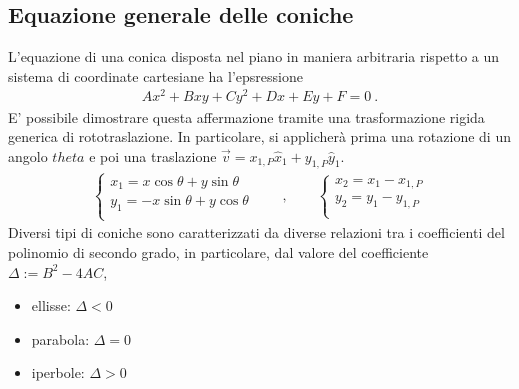 \documentclass[letterpaper,10pt,english]{jupyterBook}
\begin{document}
\subsection{Equazione generale delle coniche}
\label{\detokenize{ch/analytic_geometry/analytic_geometry_2d/conics-general:equazione-generale-delle-coniche}}\label{\detokenize{ch/analytic_geometry/analytic_geometry_2d/conics-general:geometry-analytic-2d-conics-general}}\label{\detokenize{ch/analytic_geometry/analytic_geometry_2d/conics-general::doc}}
\sphinxAtStartPar
L’equazione di una conica disposta nel piano in maniera arbitraria rispetto a un sistema di coordinate cartesiane ha l’epsressione
\begin{equation*}
\begin{split}A x^2 + B x y + C y^2 + D x + E y + F = 0 \ .\end{split}
\end{equation*}
\sphinxAtStartPar
E’ possibile dimostrare questa affermazione tramite una trasformazione rigida generica di roto\sphinxhyphen{}traslazione. In particolare, si applicherà prima una rotazione di un angolo \(theta\) e poi una traslazione \(\vec{v} = x_{1,P} \hat{x}_1 + y_{1,P} \hat{y}_1\).
\begin{equation*}
\begin{split}
\begin{cases}
x_1 =   x \cos \theta + y \sin \theta \\
y_1 = - x \sin \theta + y \cos \theta \\
\end{cases}
\qquad , \qquad
\begin{cases}
x_2 = x_1 - x_{1,P}  \\
y_2 = y_1 - y_{1,P}  \\
\end{cases}
\end{split}
\end{equation*}
\sphinxAtStartPar
Diversi tipi di coniche sono caratterizzati da diverse relazioni tra i coefficienti del polinomio di secondo grado, in particolare, dal valore del coefficiente \(\Delta := B^2 - 4 A C\),
\begin{itemize}
\item {} 
\sphinxAtStartPar
ellisse:  \(\Delta < 0\)

\item {} 
\sphinxAtStartPar
parabola: \(\Delta = 0\)

\item {} 
\sphinxAtStartPar
iperbole: \(\Delta > 0\)

\end{itemize}
\end{document}

